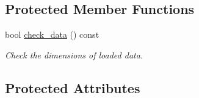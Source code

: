 \subsection*{Protected Member Functions}
\begin{DoxyCompactItemize}
\item 
bool \hyperlink{classlbann_1_1offline__patches__npz_a44d8cad35ff9ad245856c5408965e53b}{check\+\_\+data} () const
\begin{DoxyCompactList}\small\item\em Check the dimensions of loaded data. \end{DoxyCompactList}\end{DoxyCompactItemize}
\subsection*{Protected Attributes}
